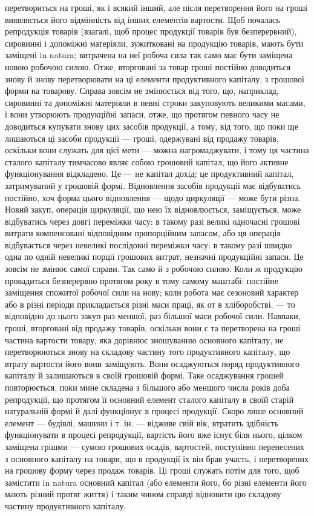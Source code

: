 \parcont{}  %
перетвориться на гроші, як і всякий інший, але після перетворення його
на гроші виявляється його відмінність від інших елементів вартости.
Щоб почалась репродукція товарів (взагалі, щоб процес продукції
товарів був безперервний), сировинні і допоміжні матеріяли, зужитковані на
продукцію товарів, мають бути заміщені in natura; витрачена на неї робоча
сила так само має бути заміщена новою робочою силою. Отже, вторговані
за товар гроші постійно доводиться знову й знову перетворювати на ці елементи
продуктивного капіталу, з грошової форми на товарову. Справа зовсім
не змінюється від того, що, наприклад, сировинні та допоміжні матеріяли
в певні строки закуповують великими масами, і вони утворюють
продукційні запаси, отже, що протягом певного часу не доводиться купувати
знову цих засобів продукції, а тому, від того, що поки ще
лишаються ці засоби продукції — гроші, одержувані від продажу товарів,
оскільки вони служать для цієї мети — можна нагромаджувати, і тому
ця частина сталого капіталу тимчасово являє собою грошовий капітал,
що його активне функціонування відкладено. Це — не капітал \deq{} дохід; це
продуктивний капітал, затримуваний у грошовій формі. Відновлення засобів
продукції має відбуватись постійно, хоч форма цього відновлення
— щодо циркуляції — може бути різна. Новий закуп, операція циркуляції,
що нею їх відновлюється, заміщується, може відбуватись через довгі переміжки
часу: в такому разі великі одночасні грошові витрати компенсовані
відповідним пропорційним запасом, або ця операція відбувається через невеликі
послідовні переміжки часу: в такому разі швидко одна по одній невеликі
порції грошових витрат, незначні продукційні запаси. Це зовсім не
змінює самої справи. Так само й з робочою силою. Коли ж продукцію
провадиться безперервно протягом року в тому самому маштабі: постійне
заміщення спожитої робочої сили на нову; коли робота має сезоновий характер
або в різні періоди прикладається різні маси праці, як от в хліборобстві,
— то відповідно до цього закуп раз меншої, раз більшої маси робочої
сили. Навпаки, гроші, вторговані від продажу товарів, оскільки вони
є та перетворена на гроші частина вартости товару, яка дорівнює зношуванню
основного капіталу, не перетворюються знову на складову частину
того продуктивного капіталу, що втрату вартости його вони заміщують.
Вони осаджуються поряд продуктивного капіталу й залишаються в своїй
грошовій формі. Таке осаджування грошей повторюється, поки мине
складена з більшого або меншого числа років доба репродукції, що
протягом її основний елемент сталого капіталу в своїй старій натуральній
формі й далі функціонує в процесі продукції. Скоро лише основний
елемент — будівлі, машини і т. ін. — відживе свій вік, втратить здібність
функціонувати в процесі репродукції, вартість його вже існує біля нього,
цілком заміщена грішми — сумою грошових осадів, вартостей, поступінно
перенесених з основного капіталу на товари, що в продукції їх він брав
участь, і перетворених на грошову форму через продаж товарів. Ці гроші
служать потім для того, щоб замістити in natura основний капітал (або
елементи його, бо різні елементи його мають різний протяг життя) і таким
чином справді відновити цю складову частину продуктивного капіталу.
\parbreak{}  %
